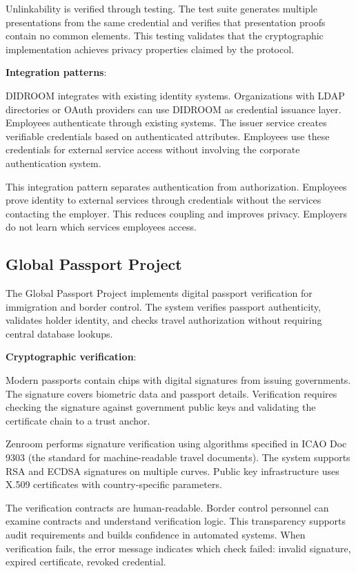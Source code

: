 Unlinkability is verified through testing. The test suite generates
multiple presentations from the same credential and verifies that
presentation proofs contain no common elements. This testing validates
that the cryptographic implementation achieves privacy properties
claimed by the protocol.

\textbf{Integration patterns}:

DIDROOM integrates with existing identity systems. Organizations with
LDAP directories or OAuth providers can use DIDROOM as credential
issuance layer. Employees authenticate through existing systems. The
issuer service creates verifiable credentials based on authenticated
attributes. Employees use these credentials for external service
access without involving the corporate authentication system.

This integration pattern separates authentication from
authorization. Employees prove identity to external services through
credentials without the services contacting the employer. This reduces
coupling and improves privacy. Employers do not learn which services
employees access.

\subsection{Global Passport Project}

The Global Passport Project implements digital passport verification
for immigration and border control. The system verifies passport
authenticity, validates holder identity, and checks travel
authorization without requiring central database lookups.

\textbf{Cryptographic verification}:

Modern passports contain chips with digital signatures from issuing
governments. The signature covers biometric data and passport
details. Verification requires checking the signature against
government public keys and validating the certificate chain to a trust
anchor.

Zenroom performs signature verification using algorithms specified in
ICAO Doc 9303 (the standard for machine-readable travel
documents). The system supports RSA and ECDSA signatures on multiple
curves. Public key infrastructure uses X.509 certificates with
country-specific parameters.

The verification contracts are human-readable. Border control
personnel can examine contracts and understand verification
logic. This transparency supports audit requirements and builds
confidence in automated systems. When verification fails, the error
message indicates which check failed: invalid signature, expired
certificate, revoked credential.

